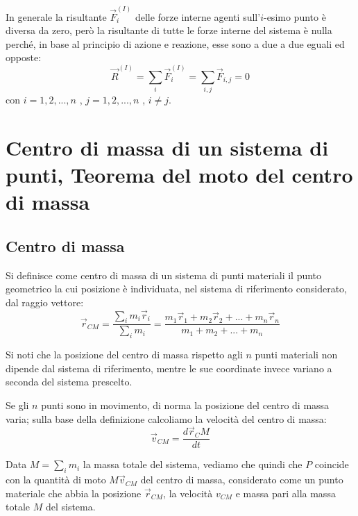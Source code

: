 \documentclass[class=book, crop=false, oneside, 12pt]{standalone}
\begin{document}
In generale la risultante \(\overrightarrow{F}_i^{(I)}\) delle forze interne agenti sull'\(i\)-esimo punto è diversa da zero, però la risultante di tutte le forze interne del sistema è nulla perché, in base al principio di azione e reazione, esse sono a due a due eguali ed opposte:
\begin{equation}
    \overrightarrow{R}^{(I)} = \sum_i \overrightarrow{F}_i^{(I)} = \sum_{i,j} \overrightarrow{F}_{i,j} = 0 
\end{equation}
con \(i  = 1,2,...,n\) , \(j = 1,2,...,n\) , \(i \neq j\).

\section{Centro di massa di un sistema di punti, Teorema del moto del centro di massa}

\subsection{Centro di massa}

Si definisce come centro di massa di un sistema di punti materiali il punto geometrico la cui posizione è individuata, nel sistema di riferimento considerato, dal raggio vettore:
\begin{equation}
    \overrightarrow{r}_{CM} = \frac{\sum_i {m_i \overrightarrow{r}_i}}{\sum_i m_i} = \frac{m_1 \overrightarrow{r}_1 + m_2 \overrightarrow{r}_2 + ... + m_n \overrightarrow{r}_n}{m_1 + m_2 + ... + m_n}
\end{equation}

Si noti che la posizione del centro di massa rispetto agli \(n\) punti materiali non dipende dal sistema di riferimento, mentre le sue coordinate invece variano a seconda del sistema prescelto.

Se gli \(n\) punti sono in movimento, di norma la posizione del centro di massa varia; sulla base della definizione calcoliamo la velocità del centro di massa:
\begin{equation}
    \overrightarrow{v}_{CM} = \frac{d \overrightarrow{r}_CM}{dt}
\end{equation}

Data \(M = \sum_i m_i\) la massa totale del sistema, vediamo che quindi che \(P\) coincide con la quantità di moto \(M \overrightarrow{v}_{CM}\) del centro di massa, considerato come un punto materiale che abbia la posizione \(\overrightarrow{r}_{CM}\), la velocità \(v_{CM}\) e massa pari alla massa totale \(M\) del sistema.
\end{document}
